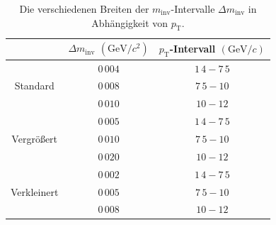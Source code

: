 \begin{table}[b!]
\centering
\begin{tabular}{c|c|c|}
\cline{2-3}
                                                          & $\Delta m_\text{inv}$ $\left(\text{GeV}/c^{2}\right)$ & $p_\text{T}$-Intervall $\left(\text{GeV}/c\right)$ \\ \hline
\multicolumn{1}{|c|}{\multirow{3}{*}{Standard}}           & $0\,004$                                              & $1\,4-7\,5$                                        \\ \cline{2-3} 
\multicolumn{1}{|c|}{}                                    & $0\,008$                                              & $7\,5-10$                                          \\ \cline{2-3} 
\multicolumn{1}{|c|}{}                                    & $0\,010$                                              & $10-12$                                            \\ \hline \hline
\multicolumn{1}{|c|}{\multirow{3}{*}{Vergr{\"o}{\ss}ert}} & $0\,005$                                              & $1\,4-7\,5$                                        \\ \cline{2-3} 
\multicolumn{1}{|c|}{}                                    & $0\,010$                                              & $7\,5-10$                                          \\ \cline{2-3} 
\multicolumn{1}{|c|}{}                                    & $0\,020$                                              & $10-12$                                            \\ \hline \hline
\multicolumn{1}{|c|}{\multirow{3}{*}{Verkleinert}}        & $0\,002$                                              & $1\,4-7\,5$                                        \\ \cline{2-3} 
\multicolumn{1}{|c|}{}                                    & $0\,005$                                               & $7\,5-10$                                          \\ \cline{2-3} 
\multicolumn{1}{|c|}{}                                    & $0\,008$                                              & $10-12$                                            \\ \hline
\end{tabular}
\caption{Die verschiedenen Breiten der $m_\text{inv}$-Intervalle $\Delta m_\text{inv}$ in Abhängigkeit von $p_\text{T}$.}
\label{tab:Binning}
\end{table}
